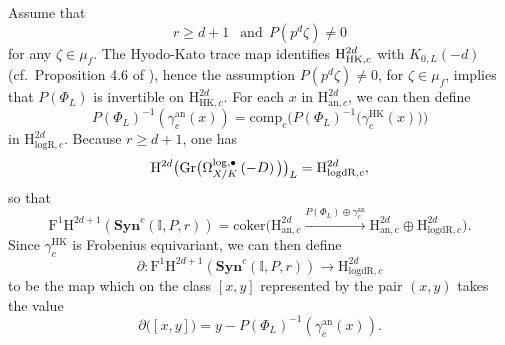 \documentclass[asterisque,english]{smfart}
\newcommand{\lfre}[1]{\stackrel{#1}{\longrightarrow}}
\newcommand{\ges}{\geqslant}
\begin{document}
Assume that $$r\ges d+1\ \ \text{ and}\ \  P\left( p^{d}\zeta \right) \neq 0$$
for any $\zeta \in \mu _{f}$. The Hyodo-Kato trace map identifies $\mathrm{%
H}_{\mathrm{HK},c}^{2d}$ with $K_{0,L}\left( -d\right)$ (cf.\ Proposition 4.6 of \cite{EY}), hence the assumption 
$P\left( p^{d}\zeta \right) \neq 0$, for $\zeta\in{}\mu_{f}$, implies that $P\left( \Phi _{L}\right) $ is invertible on $\mathrm{H}_{\mathrm{HK}%
,c}^{2d}$. For each $x$ in $\mathrm{H}^{2d}_{\mathrm{an},c}$, we can then define  
\[
     P\left( \Phi_{L}\right) ^{-1}\left( \gamma _{c}^{\mathrm{an}}\left( x\right) \right)=\mathrm{comp}_{c}\big(P(\Phi_{L})^{-1}\big(\gamma^{\mathrm{HK}}_{c}(x)\big)\big)
\]
in $\mathrm{H}_{\mathrm{logR},c}^{2d}$.  Because $r\ges d+1$,
one has $$\mathrm{H}^{2d}\big( \mathrm{Gr}\big( \Omega _{X/K}^{\mathrm{%
log},\bullet }\left( -D\right) \big) \big) _{L}=\mathrm{H}_{\mathrm{logdR%
},c}^{2d},$$ so that 
\begin{equation}\label{eq:ridondante }
    \mathrm{F}^{1}\mathrm{H}^{2d+1}\left( \mathbf{Syn}^{c}\left( \mathbb{I},P,r\right) \right)=\mathrm{coker}\Big(\mathrm{H}^{2d}_{\mathrm{an},c}\lfre{P(\Phi_{L})\oplus{}\gamma^{\mathrm{an}}_{c}}
    \mathrm{H}^{2d}_{\mathrm{an,c}}\oplus{}\mathrm{H}^{2d}_{\mathrm{logdR},c}\Big). 
\end{equation}
Since $\gamma_{c}^{\mathrm{HK}}$ is Frobenius equivariant, we can then define 
\[
     \partial : \mathrm{F}^{1}\mathrm{H}^{2d+1}\left( \mathbf{Syn}^{c}\left( \mathbb{I},P,r\right) \right)\lfre{}\mathrm{H}^{2d}_{\mathrm{logdR},c}
\]
to be the map which on the class $[x,y]$ represented by the pair $(x,y)$ takes the value  
\[
       \partial\big([x,y]\big)=y-P(\Phi_{L})^{-1}(\gamma^{\mathrm{an}}_{c}(x)).
\]
\end{document}
